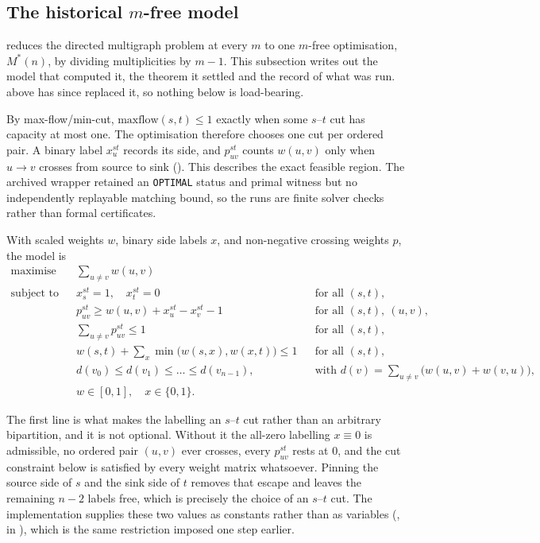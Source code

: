 
\subsection{The historical \texorpdfstring{$m$}{m}-free model}\label{sec:mstar-model}

 reduces the directed multigraph problem at every $m$ to one $m$-free optimisation, $M^{*}(n)$, by dividing multiplicities by $m-1$. This subsection writes out the model that computed it, the theorem it settled and the record of what was run.  above has since replaced it, so nothing below is load-bearing.

By max-flow/min-cut, $\mathrm{maxflow}(s,t)\le1$ exactly when some $s$--$t$ cut has capacity at most one. The optimisation therefore chooses one cut per ordered pair. A binary label $x^{st}_u$ records its side, and $p^{st}_{uv}$ counts $w(u,v)$ only when $u\to v$ crosses from source to sink (). This describes the exact feasible region. The archived wrapper retained an \texttt{OPTIMAL} status and primal witness but no independently replayable matching bound, so the runs are finite solver checks rather than formal certificates.

With scaled weights $w$, binary side labels $x$, and non-negative crossing weights $p$, the model is
\begin{align*}
    \text{maximise} \quad & \sum_{u \ne v} w(u, v) \\
    \text{subject to} \quad & x^{st}_s = 1, \quad x^{st}_t = 0 && \text{for all } (s,t), \\
    & p^{st}_{uv} \ge w(u, v) + x^{st}_u - x^{st}_v - 1 && \text{for all } (s,t),\ (u,v), \\
    & \sum_{u \ne v} p^{st}_{uv} \le 1 && \text{for all } (s,t), \\
    & w(s,t) + \sum_{x} \min\bigl(w(s,x), w(x,t)\bigr) \le 1 && \text{for all } (s,t), \\
    & d(v_0) \le d(v_1) \le \dots \le d(v_{n-1}), && \text{with } d(v) = \textstyle\sum_{u \ne v} \bigl(w(u,v) + w(v,u)\bigr), \\
    & w \in [0,1], \quad x \in \{0,1\}.
\end{align*}

The first line is what makes the labelling an $s$--$t$ cut rather than an arbitrary bipartition, and it is not optional. Without it the all-zero labelling $x \equiv 0$ is admissible, no ordered pair $(u,v)$ ever crosses, every $p^{st}_{uv}$ rests at $0$, and the cut constraint below is satisfied by every weight matrix whatsoever. Pinning the source side of $s$ and the sink side of $t$ removes that escape and leaves the remaining $n-2$ labels free, which is precisely the choice of an $s$--$t$ cut. The implementation supplies these two values as constants rather than as variables (, in ), which is the same restriction imposed one step earlier.

